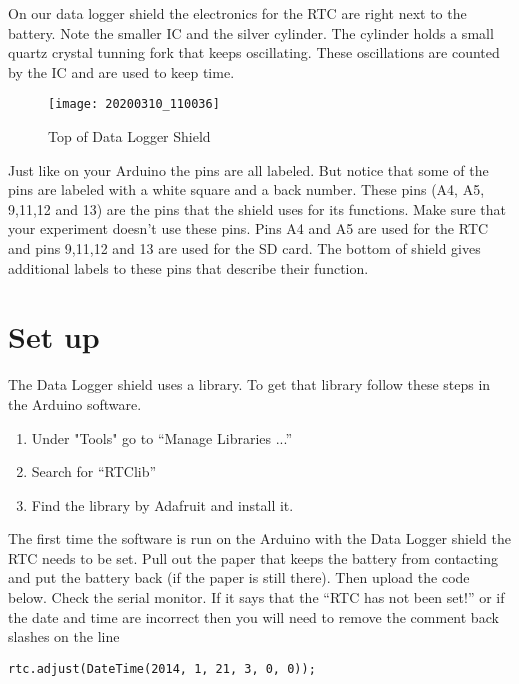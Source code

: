 	On our data logger shield the electronics for the RTC are right next to the battery. Note the smaller IC and the silver cylinder. The cylinder holds a small quartz crystal tunning fork that keeps oscillating. These oscillations are counted by the IC and are used to keep time. 
	
	\begin{figure}[h!] 
		\centering
		\caption{Top of Data Logger Shield}
		\label{Data_Logger}
		\texttt{[image: 20200310\_110036]}
	\end{figure}
	
	Just like on your Arduino the pins are all labeled. But notice that some of the pins are labeled with a white square and a back number. These pins (A4, A5, 9,11,12 and 13) are the pins that the shield uses for its functions. Make sure that your experiment doesn't use these pins. Pins A4 and A5 are used for the RTC and pins 9,11,12 and 13 are used for the SD card. The bottom of shield gives additional labels to these pins that describe their function. 



\section{Set up}
	The Data Logger shield uses a library. To get that library follow these steps in the Arduino software.
	
	\begin{enumerate}
		\item Under "Tools" go to ``Manage Libraries ...''
		\item Search for ``RTClib''
		\item Find the library by Adafruit and install it.
	\end{enumerate}

    The first time the software is run on the Arduino with the Data Logger shield the RTC needs to be set.  Pull out the paper that keeps the battery from contacting  and put the battery back (if the paper is still there). Then upload the code below. Check the serial monitor. If it says that the ``RTC has not been set!'' or if the date and time are incorrect then you will need to remove the comment back slashes on the line 
    
    \begin{lstlisting}[language=Arduino]
   		 rtc.adjust(DateTime(2014, 1, 21, 3, 0, 0));
    \end{lstlisting}
    
